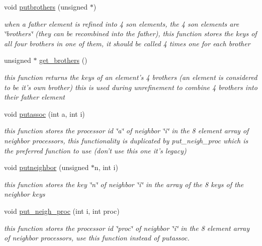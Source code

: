 \begin{CompactItemize}
void \hyperlink{classElement_a15}{putbrothers} (unsigned $\ast$)
\begin{CompactList}\small\item\em when a father element is refined into 4 son elements, the 4 son elements are \char`\"{}brothers\char`\"{} (they can be recombined into the father), this function stores the keys of all four brothers in one of them, it should be called 4 times one for each brother \item\end{CompactList}\item 
unsigned $\ast$ \hyperlink{classElement_a16}{get\_\-brothers} ()
\begin{CompactList}\small\item\em this function returns the keys of an element's 4 brothers (an element is considered to be it's own brother) this is used during unrefinement to combine 4 brothers into their father element \item\end{CompactList}\item 
void \hyperlink{classElement_a17}{putassoc} (int a, int i)
\begin{CompactList}\small\item\em this function stores the processor id \char`\"{}a\char`\"{} of neighbor \char`\"{}i\char`\"{} in the 8 element array of neighbor processors, this functionality is duplicated by put\_\-neigh\_\-proc which is the preferred function to use (don't use this one it's legacy) \item\end{CompactList}\item 
void \hyperlink{classElement_a18}{putneighbor} (unsigned $\ast$n, int i)
\begin{CompactList}\small\item\em this function stores the key \char`\"{}n\char`\"{} of neighbor \char`\"{}i\char`\"{} in the array of the 8 keys of the neighbor keys \item\end{CompactList}\item 
void \hyperlink{classElement_a19}{put\_\-neigh\_\-proc} (int i, int proc)
\begin{CompactList}\small\item\em this function stores the processor id \char`\"{}proc\char`\"{} of neighbor \char`\"{}i\char`\"{} in the 8 element array of neighbor processors, use this function instead of putassoc. \item\end{CompactList}\item 

\end{CompactItemize}
